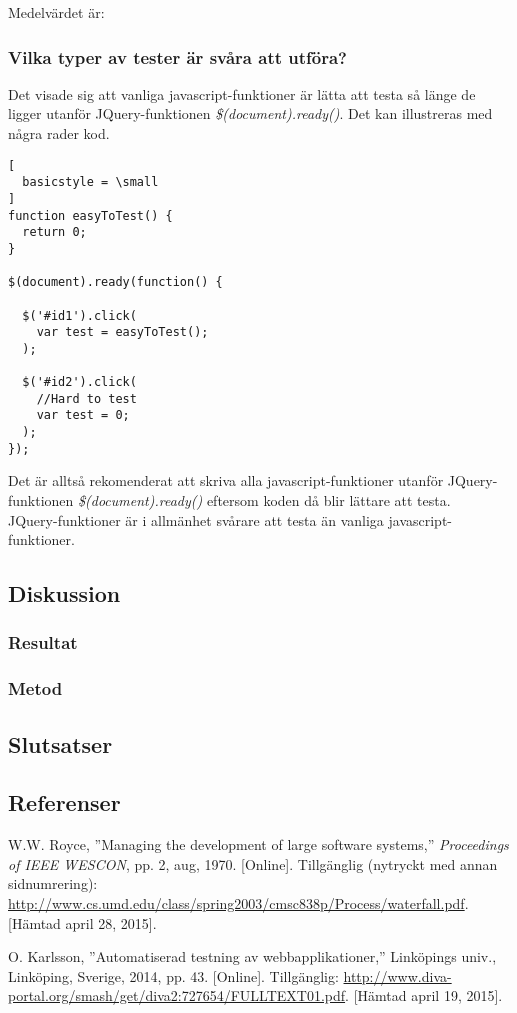 Medelvärdet är:

\subsubsection{Vilka typer av tester är svåra att utföra?}
Det visade sig att vanliga javascript-funktioner är lätta
att testa så länge de ligger utanför JQuery-funktionen
\emph{\$(document).ready()}. Det kan illustreras med några
rader kod.

\begin{lstlisting}[
  basicstyle = \small
]
function easyToTest() {
  return 0;
}

$(document).ready(function() {

  $('#id1').click(
    var test = easyToTest(); 
  );

  $('#id2').click(
    //Hard to test
    var test = 0; 
  );
});

\end{lstlisting}

Det är alltså rekomenderat att skriva alla javascript-funktioner utanför 
JQuery-funktionen \emph{\$(document).ready()} eftersom koden då blir 
lättare att testa.\\

JQuery-funktioner är i allmänhet svårare att testa än vanliga
javascript-funktioner.

\subsection{Diskussion}
\subsubsection{Resultat}
\subsubsection{Metod}
\subsection{Slutsatser}
\subsection{Referenser}
\vspace{-9mm}
\renewcommand{\refname}{}
\begin{thebibliography}{9}

W.W. Royce, ''Managing the development of large software systems,''
\textit{Proceedings of IEEE WESCON}, pp. 2, aug, 1970.
[Online].
Tillgänglig (nytryckt med annan sidnumrering):
\url{http://www.cs.umd.edu/class/spring2003/cmsc838p/Process/waterfall.pdf}.
[Hämtad april 28, 2015].

O. Karlsson, ''Automatiserad testning av webbapplikationer,''
Linköpings univ., Linköping, Sverige, 2014, pp. 43.
[Online]. 
Tillgänglig: 
\url{http://www.diva-portal.org/smash/get/diva2:727654/FULLTEXT01.pdf}.
[Hämtad april 19, 2015].

\end{thebibliography}
